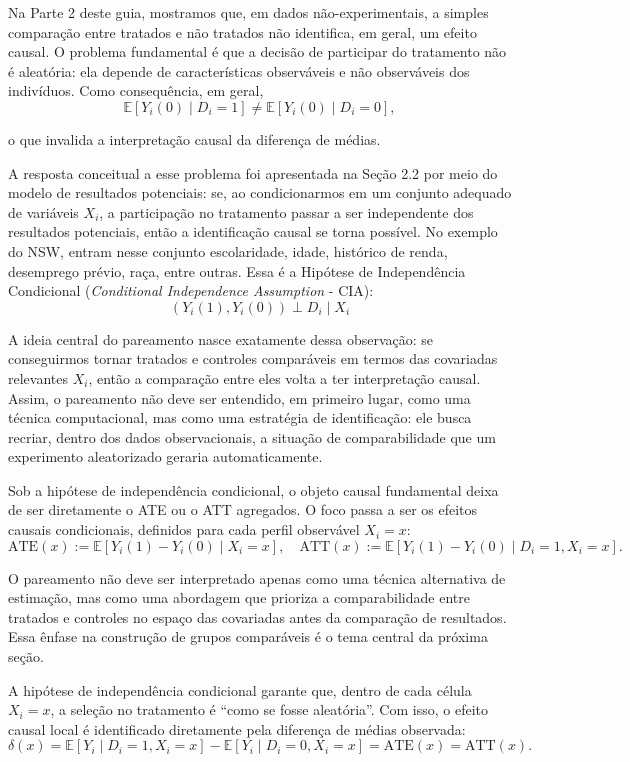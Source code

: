 Na Parte 2 deste guia, mostramos que, em dados não-experimentais, a simples comparação entre tratados e não tratados não identifica, em geral, um efeito causal. O problema fundamental é que a decisão de participar do tratamento não é aleatória: ela depende de características observáveis e não observáveis dos indivíduos. Como consequência, em geral,
$$
\mathbb{E}[Y_i(0) \mid D_i = 1] \neq \mathbb{E}[Y_i(0) \mid D_i = 0],
$$

o que invalida a interpretação causal da diferença de médias.

A resposta conceitual a esse problema foi apresentada na Seção 2.2 por meio do modelo de resultados potenciais: se, ao condicionarmos em um conjunto adequado de variáveis  $X_i$, a participação no tratamento passar a ser independente dos resultados potenciais, então a identificação causal se torna possível. No exemplo do NSW, entram nesse conjunto escolaridade, idade, histórico de renda, desemprego prévio, raça, entre outras. Essa é a Hipótese de Independência Condicional (\textit{Conditional Independence Assumption} - CIA):
$$
(Y_i(1),Y_i(0)) \perp D_i \mid X_i
$$

A ideia central do pareamento nasce exatamente dessa observação: se conseguirmos tornar tratados e controles comparáveis em termos das covariadas relevantes $X_i$, então a comparação entre eles volta a ter interpretação causal. Assim, o pareamento não deve ser entendido, em primeiro lugar, como uma técnica computacional, mas como uma estratégia de identificação: ele busca recriar, dentro dos dados observacionais, a situação de comparabilidade que um experimento aleatorizado geraria automaticamente.

Sob a hipótese de independência condicional, o objeto causal fundamental deixa de ser diretamente o ATE ou o ATT agregados. O foco passa a ser os efeitos causais condicionais, definidos para cada perfil observável $X_i = x$:
\[
\text{ATE}(x) := \mathbb{E}\!\left[ Y_i(1) - Y_i(0) \mid X_i = x \right], 
\quad 
\text{ATT}(x) := \mathbb{E}\!\left[ Y_i(1) - Y_i(0) \mid D_i = 1, X_i = x \right].
\]

O pareamento não deve ser interpretado apenas como uma técnica alternativa de estimação, mas como uma abordagem que prioriza a comparabilidade entre tratados e controles no espaço das covariadas antes da comparação de resultados. Essa ênfase na construção de grupos comparáveis é o tema central da próxima seção.


A hipótese de independência condicional garante que, dentro de cada célula $X_i = x$, a seleção no tratamento é ``como se fosse aleatória''. Com isso, o efeito causal local é identificado diretamente pela diferença de médias observada:
\[
\delta(x)
=
\mathbb{E}\!\left[ Y_i \mid D_i = 1, X_i = x \right]
-
\mathbb{E}\!\left[ Y_i \mid D_i = 0, X_i = x \right]
=
\text{ATE}(x)
=
\text{ATT}(x).
\]

